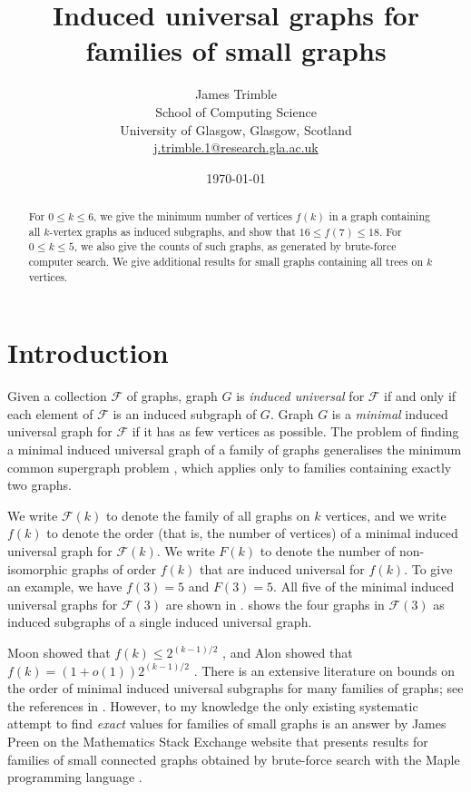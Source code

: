 \documentclass[12pt]{article}
\title{Induced universal graphs for families of small graphs}
\author{
        James Trimble \\
                School of Computing Science\\
        University of Glasgow, Glasgow, Scotland \\
        \href{mailto:j.trimble.1@research.gla.ac.uk}{j.trimble.1@research.gla.ac.uk}
}
\date{\today}
\newcommand{\calF}{\ensuremath{\mathcal{F}}}
\begin{document}
\maketitle
%
\begin{abstract}
For $0 \leq k \leq 6$, we give the minimum number of vertices $f(k)$ in a graph containing all
$k$-vertex graphs as induced subgraphs, and show
that $16 \leq f(7) \leq 18$.  For $0 \leq k \leq 5$, we also give the counts of
such graphs, as generated by brute-force computer search.  We give additional
results for small graphs containing all trees on $k$ vertices.
\end{abstract}

\section{Introduction}

Given a collection $\calF$ of graphs, graph $G$ is \emph{induced universal} for
$\calF$ if and only if each element of $\calF$ is an induced subgraph of $G$.
Graph $G$ is a \emph{minimal} induced universal graph for $\calF$ if it has as
few vertices as possible.  The problem of finding a minimal induced universal graph
of a family of graphs generalises the minimum common supergraph problem
\cite{DBLP:journals/computing/BunkeJK00}, which applies only to families
containing exactly two graphs.

We write $\calF(k)$ to denote the family of all graphs on $k$ vertices,
and we write $f(k)$ to denote the order (that is, the
number of vertices) of a minimal induced universal graph for $\calF(k)$.
We write $F(k)$ to denote the number of non-isomorphic graphs of order $f(k)$
that are induced universal for $f(k)$.
To give an example, we have $f(3)=5$ and $F(3)=5$. All five of the minimal induced universal graphs
for $\calF(3)$ are shown in .  shows the four
graphs in $\calF(3)$ as induced subgraphs of a single induced universal graph.

Moon showed that $f(k) \leq 2^{(k-1)/2}$
\cite{moon_1965}, and Alon showed that $f(k) = (1 + o(1))2^{(k-1)/2}$
\cite{alon2017asymptotically}.  There is an extensive literature on bounds on
the order of minimal induced universal subgraphs for many families of graphs;
see the references in \cite{alon2017asymptotically}.
However, to my knowledge the only
existing systematic attempt to find \emph{exact} values for families of small
graphs is an answer by James Preen on the Mathematics Stack Exchange website that
presents results for families of small connected graphs obtained by brute-force
search with the Maple programming language \cite{preen_math_se}.
\end{document}
